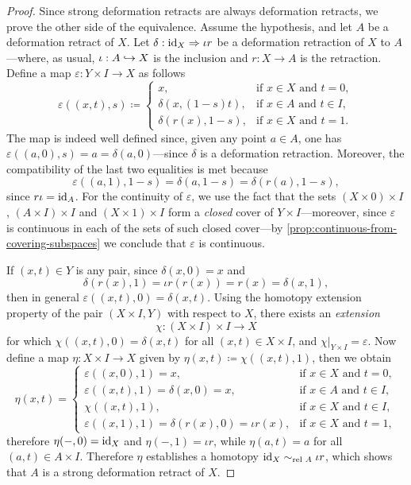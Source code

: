 \begin{proof}
Since strong deformation retracts are always deformation retracts, we prove the
other side of the equivalence. Assume the hypothesis, and let \(A\) be a
deformation retract of \(X\). Let \(\delta: \operatorname{id}_X \Rightarrow \iota r\) be a
deformation retraction of \(X\) to \(A\)---where, as usual, \(\iota: A \hookrightarrow X\)
is the inclusion and \(r: X \to A\) is the retraction. Define a map
\(\varepsilon: Y \times I \to X\) as follows
\[
\varepsilon((x, t), s) \coloneq
\begin{cases}
  x,                   &\text{if } x \in X \text{ and } t = 0, \\
  \delta(x, (1-s)t),   &\text{if } x \in A \text{ and } t \in I, \\
  \delta(r(x), 1 - s), &\text{if } x \in X \text{ and } t = 1.
\end{cases}
\]
The map is indeed well defined since, given any point \(a \in A\), one has
\(\varepsilon((a, 0), s) = a = \delta(a, 0)\)---since \(\delta\) is a
deformation retraction. Moreover, the compatibility of the last two equalities
is met because
\[
\varepsilon((a, 1), 1 - s) = \delta(a, 1 - s) = \delta(r(a), 1 - s),
\]
since \(r \iota = \operatorname{id}_A\). For the continuity of \(\varepsilon\), we use the
fact that the sets \((X \times 0) \times I\), \((A \times I) \times I\) and
\((X \times 1) \times I\) form a \emph{closed} cover of
\(Y \times I\)---moreover, since \(\varepsilon\) is continuous in each of the
sets of such closed cover---by \cref{prop:continuous-from-covering-subspaces} we
conclude that \(\varepsilon\) is continuous.

If \((x, t) \in Y\) is any pair, since \(\delta(x, 0) = x\) and
\[
\delta(r(x), 1) = \iota r(r(x)) = r(x) = \delta(x, 1),
\]
then in general \(\varepsilon((x, t), 0) = \delta(x, t)\). Using the homotopy
extension property of the pair \((X \times I, Y)\) with respect to \(X\), there
exists an \emph{extension}
\[
\chi: (X \times I) \times I \to X
\]
for which \(\chi((x, t), 0) = \delta(x, t)\) for all \((x, t) \in X \times I\),
and \(\chi|_{Y \times I} = \varepsilon\). Now define a map \(\eta: X \times I
\to X\) given by \(\eta(x, t) \coloneq \chi((x, t), 1)\), then we obtain
\[
\eta(x, t) =
\begin{cases}
  \varepsilon((x, 0), 1) = x,
    &\text{if } x \in X \text{ and } t = 0,
  \\
  \varepsilon((x, t), 1) = \delta(x, 0) = x,
    &\text{if } x \in A \text{ and } t \in I,
  \\
  \chi((x, t), 1), &\text{if } x \in X \text{ and } t \in I,
  \\
  \varepsilon((x, 1), 1)
    = \delta(r(x), 0) = \iota r(x),
    &\text{if } x \in X \text{ and } t = 1,
\end{cases}
\]
therefore \(\eta(-, 0) = \operatorname{id}_X\) and \(\eta(-, 1) = \iota r\), while \(\eta(a,
t) = a\) for all \((a, t) \in A \times I\). Therefore \(\eta\) establishes a
homotopy \(\operatorname{id}_X \sim_{\text{rel }{A}} \iota r\), which shows that \(A\) is a strong
deformation retract of \(X\).
\end{proof}

